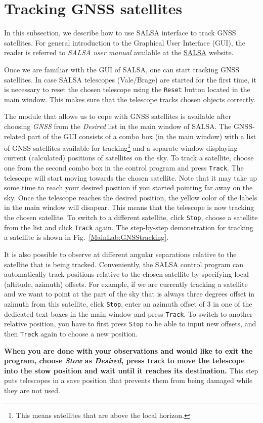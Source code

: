 \section{Tracking GNSS satellites}
In this subsection, we describe how to use SALSA interface to track GNSS satellites. For general introduction to the Graphical User Interface (GUI), the reader is referred to 
\emph{SALSA user manual} available at the \href{https://vale.oso.chalmers.se/salsa/support}{SALSA}  website. \par{}
Once we are familiar with the GUI of SALSA, one can start tracking GNSS satellites. In case SALSA telescopes (Vale/Brage) are started for the first time, it is necessary 
to reset the chosen telescope using the \verb!Reset! button located in the main window. This makes sure that the telescope tracks chosen objects correctly. \par{}
The module that allows us to cope with GNSS satellites is available after choosing \emph{GNSS} from the \emph{Desired} list in the main window of SALSA.
The GNSS-related part of the GUI consists of a combo box (in the main window) with a list of GNSS satellites available for tracking\footnote{This means satellites that are
above the local horizon.} and a separate window displaying current (calculated) positions of satellites on the sky. To track a satellite, choose one from the second combo box 
in the control program and press \verb!Track!. The telescope will start moving towards the chosen satellite. Note that it may take up some time 
to reach your desired position if you started pointing far away on the sky. Once the telescope reaches the desired position, the yellow color of the labels in the main window 
will disapear. This means that the telescope is now tracking the chosen satellite. To switch 
to a different satellite, click \verb!Stop!, choose a satellite from the list and click \verb!Track! again. The step-by-step 
demonstration for tracking a satellite is shown in Fig.~\ref{MainLab:GNSStracking}. \par{} 
It is also possible to observe at different angular separations relative to
the satellite that is being tracked. Conveniently, the SALSA control program can automatically track
positions relative to the chosen satellite by specifying local (altitude, azimuth) offsets. For example, if we are currently tracking a satellite and we want to 
point at the part of the sky that is always three degrees offset in azimuth from this satellite, click \verb!Stop!, enter an azimuth offset of 3 in one of the dedicated text 
boxes in the main window and press \verb!Track!. To switch to another relative position, you
have to first press \verb!Stop! to be able to input new offsets, and then \verb!Track! again to choose a new position. \par{}
\textbf{When you are done with your observations and would like to exit the program, choose \emph{Stow} as \emph{Desired}, press} \verb!Track! 
\textbf{to move the telescope into the stow position and wait until it reaches its destination.} This step puts telescopes in a save position that prevents them 
from being damaged while they are not used. 


